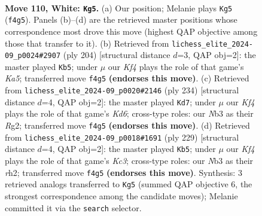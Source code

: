 \documentclass[11pt]{article}
\begin{document}
\clearpage

\begin{figure}[p]\centering
\begin{subfigure}{0.46\textwidth}\centering
\resizebox{\linewidth}{!}{%
\newchessgame
\chessboard[
  setfen={8/4R3/2k5/8/5KP1/1N6/7r/8 w - - 3 110},
  showmover=false,
  pgfstyle=straightmove, color=movearrow, markmove={f4-g5}
]}
\caption{}
\end{subfigure}\hfill
\begin{subfigure}{0.46\textwidth}\centering
\resizebox{\linewidth}{!}{%
\newchessgame
\chessboard[
  setfen={k7/8/1P6/K7/2R5/8/8/3r4 w - - 71 103},
  showmover=false,
  pgfstyle=straightmove, color=movearrow, markmove={a5-b5}
]}
\caption{}
\end{subfigure}
\\[4pt]
\begin{subfigure}{0.46\textwidth}\centering
\resizebox{\linewidth}{!}{%
\newchessgame
\chessboard[
  setfen={5r2/k1P5/3K4/8/8/8/6R1/8 w - - 15 118},
  showmover=false,
  pgfstyle=straightmove, color=movearrow, markmove={d6-d7}
]}
\caption{}
\end{subfigure}\hfill
\begin{subfigure}{0.46\textwidth}\centering
\resizebox{\linewidth}{!}{%
\newchessgame
\chessboard[
  setfen={r7/8/2k5/2p5/8/2K5/7R/8 b - - 27 115},
  showmover=false,
  pgfstyle=straightmove, color=movearrow, markmove={c6-b5}
]}
\caption{}
\end{subfigure}
\caption{\textbf{Move 110, White: \texttt{Kg5}.} (a) Our position; Melanie plays \texttt{Kg5} (\texttt{f4g5}). Panels (b)--(d) are the retrieved master positions whose correspondence most drove this move (highest QAP objective among those that transfer to it). (b) Retrieved from \texttt{lichess\_elite\_2024-09\_p0024\#2907} (ply 204) [structural distance $d$=3, QAP obj=2]: the master played \texttt{Kb5}; under $\mu$ our \emph{Kf4} plays the role of that game's \emph{Ka5}; transferred move \texttt{f4g5} \textbf{(endorses this move)}. (c) Retrieved from \texttt{lichess\_elite\_2024-09\_p0020\#2146} (ply 234) [structural distance $d$=4, QAP obj=2]: the master played \texttt{Kd7}; under $\mu$ our \emph{Kf4} plays the role of that game's \emph{Kd6}; cross-type roles: our \emph{N}b3 as their \emph{R}g2; transferred move \texttt{f4g5} \textbf{(endorses this move)}. (d) Retrieved from \texttt{lichess\_elite\_2024-09\_p0018\#1691} (ply 229) [structural distance $d$=4, QAP obj=2]: the master played \texttt{Kb5}; under $\mu$ our \emph{Kf4} plays the role of that game's \emph{Kc3}; cross-type roles: our \emph{N}b3 as their \emph{r}h2; transferred move \texttt{f4g5} \textbf{(endorses this move)}. Synthesis: 3 retrieved analogs transferred to \texttt{Kg5} (summed QAP objective 6, the strongest correspondence among the candidate moves); Melanie committed it via the \texttt{search} selector.}
\label{fig:thought-m218}
\end{figure}
\end{document}
